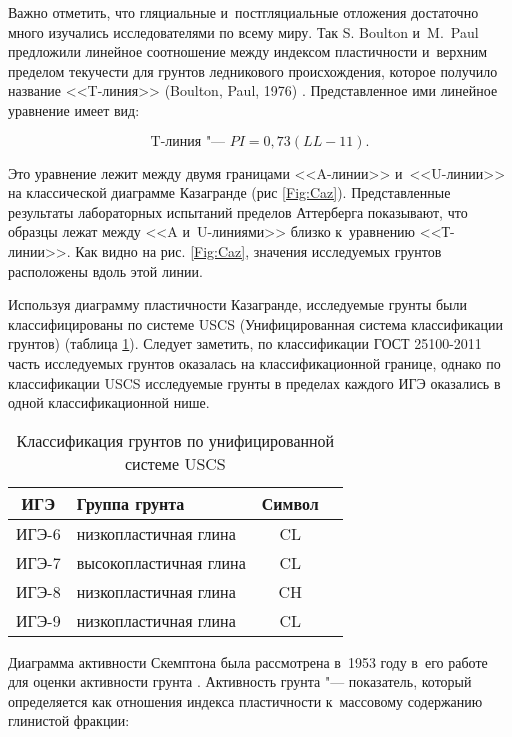 Важно отметить, что гляциальные и~постгляциальные отложения достаточно много изучались исследователями по всему миру. Так S. Boulton и~M.~Paul  предложили линейное соотношение между  индексом пластичности и~верхним пределом текучести  для грунтов ледникового происхождения, которое получило название <<T-линия>> (Boulton, Paul, 1976) \cite{boulton1976}. Представленное ими линейное уравнение имеет вид:

\begin{equation}
    \label{eq:t}
    \text{T-линия "--- } PI = 0,73 (LL-11).
\end{equation}

Это уравнение лежит между двумя границами <<A-линии>> и~<<U-линии>> на классической диаграмме Казагранде (рис \ref{Fig:Caz}). Представленные результаты лабораторных испытаний пределов Аттерберга показывают, что образцы лежат между <<A и~U-линиями>> близко к~уравнению <<Т-линии>>. 
Как видно на рис. \ref{Fig:Caz}, значения исследуемых грунтов расположены вдоль этой линии. 

Используя диаграмму пластичности Казагранде, исследуемые грунты были классифицированы по системе USCS (Унифицированная система классификации грунтов) (таблица \ref{tab:uscs}). 
Следует заметить, по классификации ГОСТ 25100-2011 \cite{gost25100} часть исследуемых грунтов оказалась на классификационной границе, однако по классификации USCS исследуемые грунты в пределах каждого ИГЭ оказались в одной классификационной нише.

\begin{table}[ht]
    \centering
    \caption{Классификация грунтов по унифицированной системе USCS} \label{tab:uscs}
    \begin{tabular}{clcc}
    ИГЭ & Группа грунта &  Символ \\
    \midrule
    ИГЭ-6 \dotfill &  низкопластичная глина & CL \\
    ИГЭ-7 \dotfill &  высокопластичная глина  & CL \\
    ИГЭ-8 \dotfill &  низкопластичная глина & CH \\
    ИГЭ-9 \dotfill &  низкопластичная глина  & CL \\
    \end{tabular}
\end{table}

Диаграмма активности Скемптона была рассмотрена в~1953 году в~его работе для оценки активности грунта \cite{skempton1953}.
Активность грунта "--- показатель, который определяется как отношения индекса пластичности к~массовому содержанию глинистой фракции:

